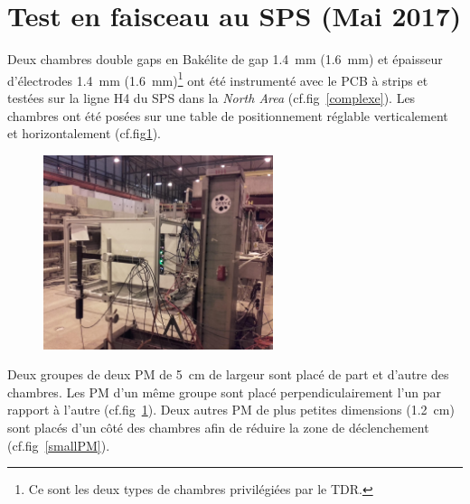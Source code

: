\section{Test en faisceau au SPS (Mai 2017)}

Deux chambres double gaps en Bakélite de gap \SI{1.4}{\milli\meter} (\SI{1.6}{\milli\meter}) et épaisseur d'électrodes \SI{1.4}{\milli\meter} (\SI{1.6}{\milli\meter})\footnote{Ce sont les deux types de chambres privilégiées par le TDR.} ont été instrumenté avec le PCB à strips et testées sur la ligne H4 du SPS dans la \textit{North Area} (cf.fig~\ref{complexe}). Les chambres ont été posées sur une table de positionnement réglable verticalement et horizontalement (cf.fig\ref{setup2017}).
\begin{figure}[ht!]
	\centering
	\includegraphics[width=0.60\textwidth]{ELE/setup2017.jpg}
	\label{setup2017}
\end{figure}

Deux groupes de deux PM de \SI{5}{\centi\meter} de largeur sont placé de part et d'autre des chambres. Les PM d'un même groupe sont placé perpendiculairement l'un par rapport à l'autre (cf.fig~\ref{setup2017}). Deux autres PM de plus petites dimensions (\SI{1.2}{\centi\meter}) sont placés d'un côté des chambres afin de réduire la zone de déclenchement (cf.fig~\ref{smallPM}).  

